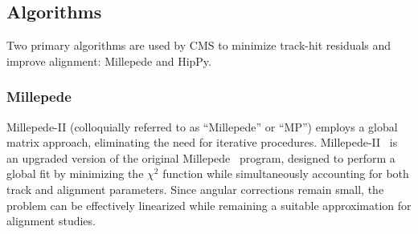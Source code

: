 





\subsection{Algorithms}

Two primary algorithms are used by CMS to minimize track-hit residuals and improve alignment: Millepede and HipPy. 

\subsubsection{Millepede}

Millepede-II (colloquially referred to as ``Millepede'' or ``MP'') employs a global matrix approach, eliminating the need for iterative procedures. Millepede-II~\cite{BLOBEL20065} is an upgraded version of the original Millepede~\cite{blobel2002newmethodhighprecisionalignment} program, designed to perform a global fit by minimizing the $\chi^2$ function while simultaneously accounting for both track and alignment parameters. Since angular corrections remain small, the problem can be effectively linearized while remaining a suitable approximation for alignment studies.

